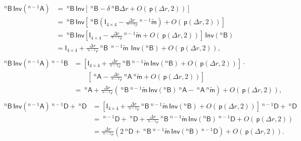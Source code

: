 \documentclass[preprint,10pt,times]{elsarticle}
\numberwithin{equation}{section}
\renewcommand{\u}[1]{\boldsymbol{#1}}
\newcommand{\usf}[1]{\u{\mathsf #1}}
\newcommand{\pr}[1]{\left( #1 \right)}
\newcommand{\p}{\,\mathsf{p}}
\newcommand{\Inv}{\,\mathsf{Inv}}
\renewcommand{\>}{$\Rightarrow$}
\begin{document}
\begin{subequations}
	\begin{align}
	\begin{split}
		~^{n}{\usf{B}} \Inv\pr{{}^{{n-1}}\usf{A}}
		& = ~^{n}{\usf{B}} \Inv\left[ ~^{n}\usf{B} - \delta ~^{n}\usf{B} \Delta r + O(\p\pr{\Delta r,2}) \right] \\
		& = ~^{n}{\usf{B}} \Inv\left[ ~^{n}\usf{B} \left( \usf{I}_{4\times 4}- \frac{\Delta r}{~^{n-1}\!{r}} ~^{n-1}\tilde{\usf{m}} \right) + O(\p\pr{\Delta r,2}) \right] \\
		& = ~^{n}{\usf{B}} \Inv\left[ \usf{I}_{4\times 4} - \frac{\Delta r}{~^{n-1}\!{r}} ~^{n-1}\tilde{\usf{m}} + O(\p\pr{\Delta r,2}) \right] \Inv\pr{{}^{{n}}\usf{B}} \\
		& = \usf{I}_{4\times 4} + \frac{\Delta r}{~^{n-1}\!{r}} ~^{n}{\usf{B}}\  ~^{n-1}\tilde{\usf{m}}\  \Inv\pr{{}^{n}\usf{B}} + O(\p\pr{\Delta r,2}),
	\end{split}\\
	\begin{split}
		~^{n}{\usf{B}} \Inv\pr{{}^{{n-1}}\usf{A}} ~^{{n-1}}{\usf{B}}
		& = \left[ \usf{I}_{4\times 4} + \frac{\Delta r}{~^{n-1}\!{r}} ~^{n}{\usf{B}} ~^{n-1}\tilde{\usf{m}} \Inv\pr{{}^{n}\usf{B}} + O(\p\pr{\Delta r,2}) \right] \cdot \\
		& \qquad \left[ ~^{n}\usf{A} - \frac{\Delta r}{~^{n-1}\!{r}} ~^{n}{\usf{A}} ~^{n}\tilde{\usf{m}} + O(\p\pr{\Delta r,2}) \right] \\
		& = ~^{n}\usf{A} + \frac{\Delta r}{~^{n-1}\!{r}} \left( ~^{n}{\usf{B}} ~^{n-1}\tilde{\usf{m}} \Inv\pr{{}^{n}\usf{B}} ~^{n}\usf{A} - ~^{n}{\usf{A}} ~^{n}\tilde{\usf{m}} \right) + O(\p\pr{\Delta r,2}),
	\end{split} \\
	\begin{split}
		~^{n}{\usf{B}} \Inv\pr{{}^{{n-1}}\usf{A}} ~^{{n-1}}{\usf{D}} + ~^{n}{\usf{D}}
		& = \left[ \usf{I}_{4\times 4} + \frac{\Delta r}{~^{n-1}\!{r}} ~^{n}{\usf{B}} ~^{n-1}\tilde{\usf{m}} \Inv\pr{{}^{n}\usf{B}} + O(\p\pr{\Delta r,2}) \right] ~^{{n-1}}{\usf{D}} + ~^{n}{\usf{D}} \\
		& = ~^{{n-1}}{\usf{D}} + ~^{n}{\usf{D}} + \frac{\Delta r}{~^{n-1}\!{r}} ~^{n}{\usf{B}} ~^{n-1}\tilde{\usf{m}} \Inv\pr{{}^{n}\usf{B}} ~^{{n-1}}{\usf{D}} + O(\p\pr{\Delta r,2}) \\
		& = \frac{\Delta r}{~^{n-1}\!{r}} \left( 2~^{n}{\usf{D}} + ~^{n}{\usf{B}} ~^{n-1}\tilde{\usf{m}} \Inv\pr{{}^{n}\usf{B}} ~^{{n-1}}{\usf{D}} \right) + O(\p\pr{\Delta r,2}).
	\end{split}
	\end{align}
	\label{eq:C5}
\end{subequations}
\end{document}
